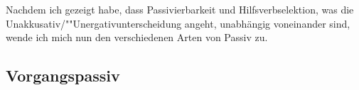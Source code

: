 Nachdem ich gezeigt habe, dass Passivierbarkeit und Hilfsverbselektion, was die
Unakkusativ/""Unergativunterscheidung angeht, unabhängig voneinander sind,
wende ich mich nun den verschiedenen Arten von Passiv zu.
%
%



\subsection{Vorgangspassiv}
\label{sec-agentive-pas}


